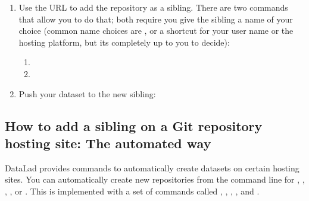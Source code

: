 \begin{enumerate}
%
\item {} 
\sphinxAtStartPar
Use the URL to add the repository as a sibling. There are two commands that allow you to do that; both require you give the sibling a name of your choice (common name choices are , or a short\sphinxhyphen{}cut for your user name or the hosting platform, but its completely up to you to decide):
\begin{enumerate}
%
\item {} 
\sphinxAtStartPar
{}

\item {} 
\sphinxAtStartPar
{}

\end{enumerate}

\item {} 
\sphinxAtStartPar
Push your dataset to the new sibling: 

\end{enumerate}


\subsection{How to add a sibling on a Git repository hosting site: The automated way}
\label{\detokenize{basics/101-139-hostingservices:how-to-add-a-sibling-on-a-git-repository-hosting-site-the-automated-way}}
\sphinxAtStartPar
DataLad provides  commands to automatically create datasets on certain hosting sites.
You can automatically create new repositories from the command line for {\hyperref[\detokenize{glossary:term-GitHub}]{}}, {\hyperref[\detokenize{glossary:term-GitLab}]{}}, {\hyperref[\detokenize{glossary:term-GIN}]{}}, , or .
This is implemented with a set of commands called , , , , and .


